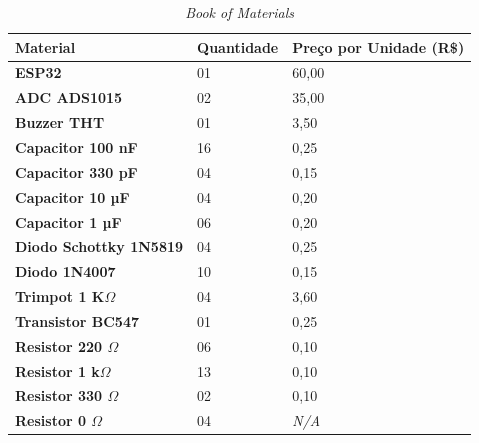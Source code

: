 \begin{table}[!ht]
    \centering
    \caption{\textit{Book of Materials}}
    \label{tab:Bookofmaterials}
    \begin{tabular}{|l|l|l|}
        \hline
        \textbf{Material}                      & \textbf{Quantidade} & \textbf{Preço por Unidade (R\$)} \\ \hline
        \textbf{ESP32}                         & 01                  & 60,00                            \\ \hline
        \textbf{ADC ADS1015}                   & 02                  & 35,00                            \\ \hline
        \textbf{Buzzer THT}                    & 01                  & 3,50                             \\ \hline
        \textbf{Capacitor 100 nF}              & 16                  & 0,25                             \\ \hline
        \textbf{Capacitor 330 pF}              & 04                  & 0,15                             \\ \hline
        \textbf{Capacitor 10 µF}               & 04                  & 0,20                             \\ \hline
        \textbf{Capacitor 1 µF}                & 06                  & 0,20                             \\ \hline
        \textbf{Diodo Schottky 1N5819}         & 04                  & 0,25                             \\ \hline
        \textbf{Diodo 1N4007}                  & 10                  & 0,15                             \\ \hline
        \textbf{Trimpot 1 K$\Omega$}           & 04                  & 3,60                             \\ \hline
        \textbf{Transistor BC547}              & 01                  & 0,25                             \\ \hline
        \textbf{Resistor 220 $\Omega$}         & 06                  & 0,10                             \\ \hline
        \textbf{Resistor 1 k$\Omega$}          & 13                  & 0,10                             \\ \hline
        \textbf{Resistor 330 $\Omega$}         & 02                  & 0,10                             \\ \hline
        \textbf{Resistor 0 $\Omega$}           & 04                  & \textit{N/A}                     \\ \hline

\end{tabular}
\end{table}
